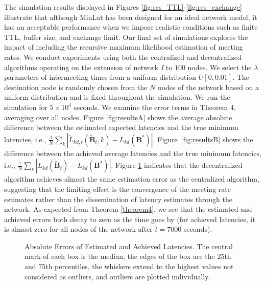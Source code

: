 \documentclass[journal,onecolumn,11pt]{IEEEtran}
\theoremstyle{plain}
\theoremstyle{definition}
\begin{document}
The simulation results displayed in Figures
\ref{fig:res_TTL}-\ref{fig:res_exchange} illustrate that although
MinLat has been designed for an ideal network model, it has an
acceptable performance when we impose realistic conditions such as finite TTL,
buffer size, and exchange limit.  
Our final set of simulations explores the impact of including the
recursive maximum likelihood estimation of meeting rates. We conduct
experiments using both the centralized and
decentralized algorithms operating on the extension of
network {\em I} to $100$ nodes. We select the $\lambda$ parameters of
intermeeting times from a uniform distribution $U[0,0.01]$. The
destination node is randomly chosen from the $N$ nodes of the network
based on a uniform distribution and is fixed throughout the
simulation. We run the simulation for $5\times 10^4$ seconds.
We examine the error terms in Theorem 4,
averaging over all nodes.  Figure \ref{fig:resultsA} shows the average
absolute difference between the estimated expected latencies and the
true minimum latencies, i.e.,
$\frac{1}{N}\sum_{k}|\widetilde{L}_{kd,t}(\widetilde{\mathbf{B}}_t,k) -
L_{kd}(\mathbf{B}^*)|$.  Figure~\ref{fig:resultsB} shows the
difference between the achieved average latencies and the true minimum latencies, i.e.,
$\frac{1}{N}\sum_{k}|L_{kd}(\widetilde{\mathbf{B}}_t) -
L_{kd}(\mathbf{B}^*)|.$
Figure \ref{fig:res3} indicates that the decentralized algorithm
achieves almost the same estimation error as the centralized
algorithm, suggesting that the limiting effect is the convergence
of the meeting rate estimates rather than the dissemination of latency
estimates through the network. As expected from Theorem \ref{theorem4}, we see that
the estimated and achieved errors both decay to zero as the time goes
by (for achieved latencies, it is almost zero for all nodes of the
network after $t=7000$ seconds).

\begin{figure}[!htb]
\centering
{}\hspace*{0.5em}
\caption{Absolute Errors of Estimated and Achieved Latencies. The central mark of each box is the median, the edges of the box
are the 25th and 75th percentiles, the whiskers extend to the highest values not considered as outliers, and outliers are plotted
individually.}
\label{fig:res3}
\end{figure}
\end{document}
